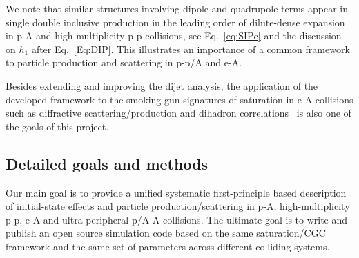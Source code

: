 We note that similar structures involving dipole and quadrupole 
terms appear in single double inclusive production in the leading order of dilute-dense expansion in 
p-A and high multiplicity p-p collisions, see Eq.~\eqref{eq:SIPc} and the discussion on $h_1$ after 
Eq.~\eqref{Eq:DIP}. This illustrates an importance of a common framework to
particle production and scattering in 
p-p/A and e-A. 


Besides 
 extending and improving the dijet analysis, the application of the 
 developed framework to the smoking gun signatures of saturation in e-A collisions such as diffractive scattering/production
and dihadron correlations~\cite{Aschenauer:2017jsk} is also one of the goals of this project. 



\vspace{0.5em}
    \subsection{Detailed goals and methods}
        \label{sec:p11}

		Our main goal is to provide a unified systematic first-principle based description of
		initial-state effects and particle production/scattering in p-A, 
		high-multiplicity p-p, e-A and ultra peripheral p/A-A collisions.  
		The ultimate goal is to write and publish an open source  simulation code based on the same saturation/CGC framework and 
		the same set of parameters across different colliding systems. 

